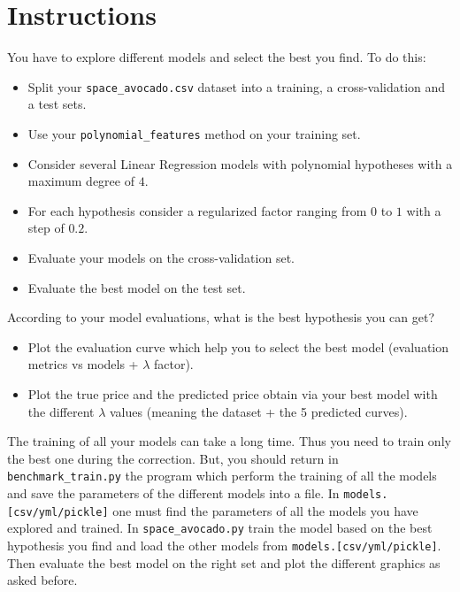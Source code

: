 \documentclass{42-en}
\begin{document}
\section*{Instructions}
You have to explore different models and select the best you find.
To do this:
\begin{itemize}
  \item Split your \texttt{space\_avocado.csv} dataset into a training, a cross-validation and a test sets.
  \item Use your \texttt{polynomial\_features} method on your training set.
  \item Consider several Linear Regression models with polynomial hypotheses with a maximum degree of $4$.
  \item For each hypothesis consider a regularized factor ranging from $0$ to $1$ with a step of $0.2$.
  \item Evaluate your models on the cross-validation set.
  \item Evaluate the best model on the test set.
\end{itemize}

According to your model evaluations, what is the best hypothesis you can get?
\begin{itemize}
  \item Plot the evaluation curve which help you to select the best model (evaluation metrics vs models + $\lambda$ factor).
  \item Plot the true price and the predicted price obtain via your best model with the different $\lambda$ values (meaning the dataset + the 5 predicted curves).
\end{itemize}


The training of all your models can take a long time.
Thus you need to train only the best one during the correction.
But, you should return in \texttt{benchmark\_train.py} the program which perform the training of all the models and save the parameters of the different models into a file.
In \texttt{models.[csv/yml/pickle]} one must find the parameters of all the models you have explored and trained.
In \texttt{space\_avocado.py} train the model based on the best hypothesis you find and load the other models from \texttt{models.[csv/yml/pickle]}.
Then evaluate the best model on the right set and plot the different graphics as asked before.

\end{document}
